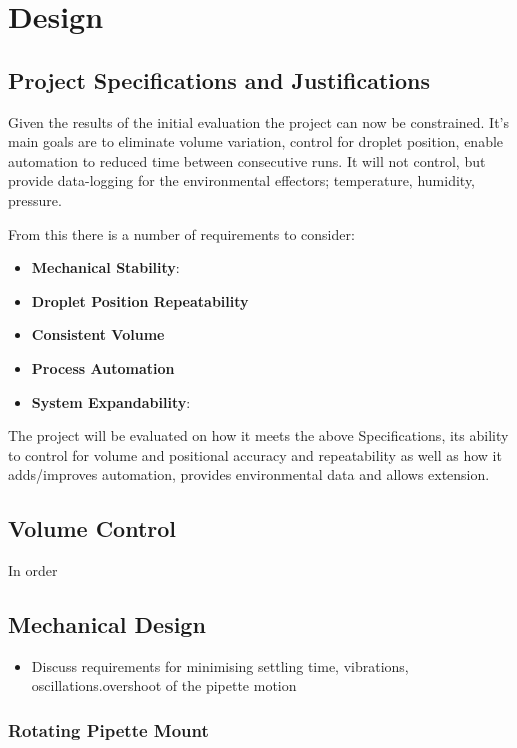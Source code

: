 \chapter{Design}\label{C:des}

\section{Project Specifications and Justifications}
Given the results of the initial evaluation the project can now be constrained. It's main goals are to eliminate volume variation, control for droplet position, enable automation to reduced time between consecutive runs. It will not control, but provide data-logging for the environmental effectors; temperature, humidity, pressure.

From this there is a number of requirements to consider:

\begin{itemize}
    \item \textbf{Mechanical Stability}:
    \item \textbf{Droplet Position Repeatability}
    \item \textbf{Consistent Volume}
    \item \textbf{Process Automation}
    \item \textbf{System Expandability}:
\end{itemize}

The project will be evaluated on how it meets the above Specifications, its ability to control for volume and positional accuracy and repeatability as well as how it adds/improves automation, provides environmental data and allows extension.


\section{Volume Control}

In order 


\section{Mechanical Design}

\begin{itemize}
    \item Discuss requirements for minimising settling time, vibrations, oscillations.overshoot of the pipette motion
\end{itemize}


\subsection{Rotating Pipette Mount}

